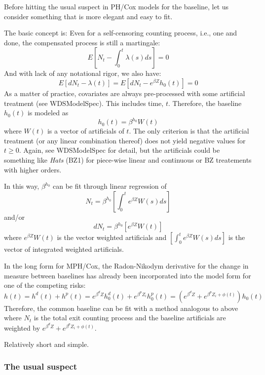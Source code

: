 \documentclass[10pt]{article}
\begin{document}
Before hitting the usual suspect in PH/Cox models for the baseline, let us consider something that is more elegant and easy to fit.

The basic concept is: Even for a self-censoring counting process, i.e., one and done, the compensated process is  still a martingale:
$$E[ N_t - \int_0^t\lambda(s)ds ] = 0 $$
And with lack of any notational rigor, we also have:
$$E[ dN_t - \lambda(t) ] = E[ dN_t - e^{\beta Z} h_0(t) ] = 0 $$
As a matter of practice, covariates are always pre-processed with some artificial treatment (see WDSModelSpec).  
This includes time, $t$.  Therefore, the baseline $h_0(t)$ is modeled as 
$$ h_0(t) = \beta^{h_0}W(t) $$
where $W(t)$ is a vector of artificials of $t$. The only criterion is that the artificial treatment (or any linear combination thereof) does not yield negative values
for $t\ge 0$.
Again, see WDSModelSpec for detail, but the artificials could be something like {\em Hats} (BZ1) for piece-wise linear and continuous
or BZ treatements with higher orders.

In this way, $\beta^{h_0}$ can be fit through linear regression of 
    $$ N_t = \beta^{h_0} [\int_0^te^{\beta Z}W(s)ds ] $$
and/or
    $$ dN_t = \beta^{h_0}[e^{\beta Z}W(t)] $$
where $e^{\beta Z}W(t)$ is the vector weighted artificials and $[\int_0^te^{\beta Z}W(s)ds]$ is the vector of integrated weighted artificials. 

In the long form for MPH/Cox, the Radon-Nikodym derivative for the change in measure between baselines has already been incorporated
into the model form for one of the competing risks:
$$ h(t) = h^d(t) + h^p(t) = e^{\beta^d Z}h^d_0(t) + e^{\beta^p Z_i}h^p_0(t) = ( e^{\beta^d Z} + e^{\beta^p Z_i + \phi(t)} ) h_0(t) $$
Therefore, the common baseline can be fit with a method analogous to above where $N_t$ is the total exit counting process and the 
baseline artificials are weighted by $e^{\beta^d Z} + e^{\beta^p Z_i + \phi(t)}$.

Relatively short and simple.


\subsubsection{The usual suspect}
\end{document}
